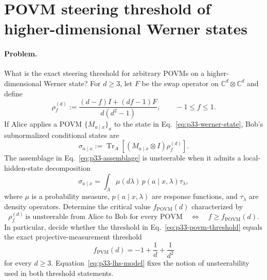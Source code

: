 \section{POVM steering threshold of higher-dimensional Werner states}
\label{sec:op_2982ddd94453b5b6}

\paragraph{Problem.}
What is the exact steering threshold for arbitrary POVMs on a
higher-dimensional Werner state?  For $d\geq3$, let $F$ be the swap operator
on $\mathbb C^d\otimes\mathbb C^d$ and define
\begin{equation}
  \rho_f^{(d)}
  :=\frac{(d-f)I+(df-1)F}{d(d^2-1)},
  \qquad -1\leq f\leq1.
  \label{eq:p33-werner-state}
\end{equation}
If Alice applies a POVM $\{M_{a\mid x}\}_a$ to the state in
Eq.~\eqref{eq:p33-werner-state}, Bob's subnormalized conditional states are
\begin{equation}
  \sigma_{a\mid x}
  :=\operatorname{Tr}_A\!\left[
    (M_{a\mid x}\otimes I)\rho_f^{(d)}
    \right].
  \label{eq:p33-assemblage}
\end{equation}
The assemblage in Eq.~\eqref{eq:p33-assemblage} is unsteerable when it admits
a local-hidden-state decomposition
\begin{equation}
  \sigma_{a\mid x}
  =\int_\Lambda\mu(d\lambda)\,
    p(a\mid x,\lambda)\tau_\lambda,
  \label{eq:p33-lhs-model}
\end{equation}
where $\mu$ is a probability measure, $p(a\mid x,\lambda)$ are response
functions, and $\tau_\lambda$ are density operators.  Determine the critical
value $f_{\mathrm{POVM}}(d)$ characterized by
\begin{equation}
  \rho_f^{(d)}\ \text{is unsteerable from Alice to Bob for every POVM}
  \quad\Longleftrightarrow\quad
  f\geq f_{\mathrm{POVM}}(d).
  \label{eq:p33-povm-threshold}
\end{equation}
In particular, decide whether the threshold in
Eq.~\eqref{eq:p33-povm-threshold} equals the exact projective-measurement
threshold
\begin{equation}
  f_{\mathrm{PVM}}(d)=-1+\frac1d+\frac1{d^2}
  \label{eq:p33-pvm-threshold}
\end{equation}
for every $d\geq3$.  Equation~\eqref{eq:p33-lhs-model} fixes the notion of
unsteerability used in both threshold statements.

